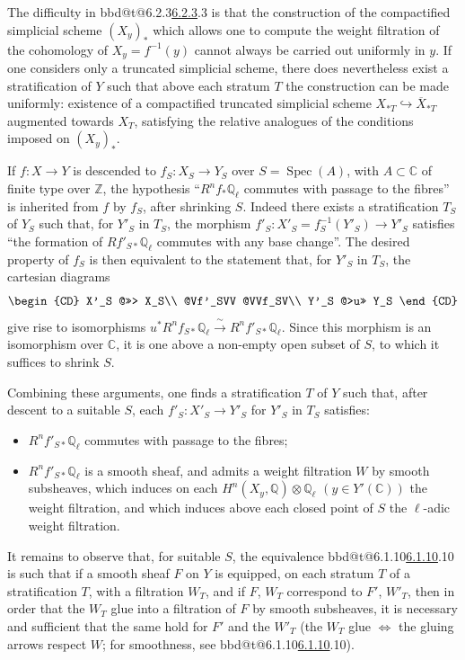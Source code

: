 \documentclass[12pt,oneside]{amsbook}
\makeatletter
\DeclareRobustCommand{\rn}[1]{%
  \ifcsname bbd@t@#1\endcsname\hyperlink{bbd:#1}{#1}\else#1\fi}
\theoremstyle{plain}
\theoremstyle{definition}
\newcommand{\C}{\mathbb{C}} \newcommand{\Q}{\mathbb{Q}}
\newcommand{\Z}{\mathbb{Z}}   \newcommand{\D}{\mathcal{D}}
\newcommand{\Ql}{\mathbb{Q}_{\ell}}
\makeatother
\begin{document}
\smallskip
The difficulty in \rn{6.2.3} is that the construction of the compactified simplicial scheme $(X_y)_*$ which allows one to compute the weight filtration of the cohomology of $X_y=f^{-1}(y)$ cannot always be carried out uniformly in $y$. If one considers only a truncated simplicial scheme, there does nevertheless exist a stratification of $Y$ such that above each stratum $T$ the construction can be made uniformly: existence of a compactified truncated simplicial scheme $X_{*T}\hookrightarrow\overline X_{*T}$ augmented towards $X_T$, satisfying the relative analogues of the conditions imposed on $(X_y)_*$.

\smallskip
If $f:X\longrightarrow Y$ is descended to $f_S:X_S\longrightarrow Y_S$ over $S=\operatorname{Spec}(A)$, with $A\subset\C$ of finite type over $\Z$, the hypothesis ``$R^n f_*\Ql$ commutes with passage to the fibres'' is inherited from $f$ by $f_S$, after shrinking $S$. Indeed there exists a stratification $T_S$ of $Y_S$ such that, for $Y'_S$ in $T_S$, the morphism $f'_S:X'_S=f_S^{-1}(Y'_S)\longrightarrow Y'_S$ satisfies ``the formation of $Rf'_{S*}\Ql$ commutes with any base change''. The desired property of $f_S$ is then equivalent to the statement that, for $Y'_S$ in $T_S$, the cartesian diagrams
\[
\begin{CD}
X'_S @>>> X_S\\
@Vf'_SVV @VVf_SV\\
Y'_S @>u>> Y_S
\end{CD}
\]
give rise to isomorphisms $u^{*}R^n f_{S*}\Ql\xrightarrow{\ \sim\ }R^n f'_{S*}\Ql$. Since this morphism is an isomorphism over $\C$, it is one above a non-empty open subset of $S$, to which it suffices to shrink $S$.

\smallskip
Combining these arguments, one finds a stratification $T$ of $Y$ such that, after descent to a suitable $S$, each $f'_S:X'_S\to Y'_S$ for $Y'_S$ in $T_S$ satisfies:

\begin{itemize}[leftmargin=2em]
\item[a)] $R^n f'_{S*}\Ql$ commutes with passage to the fibres;
\item[b)] $R^n f'_{S*}\Ql$ is a smooth sheaf, and admits a weight filtration $W$ by smooth subsheaves, which induces on each $H^n(X_y,\Q)\otimes\Ql$ $(y\in Y'(\C))$ the weight filtration, and which induces above each closed point of $S$ the $\ell$-adic weight filtration.
\end{itemize}

\smallskip
It remains to observe that, for suitable $S$, the equivalence \rn{6.1.10} is such that if a smooth sheaf $F$ on $Y$ is equipped, on each stratum $T$ of a stratification $T$, with a filtration $W_T$, and if $F$, $W_T$ correspond to $F'$, $W'_T$, then in order that the $W_T$ glue into a filtration of $F$ by smooth subsheaves, it is necessary and sufficient that the same hold for $F'$ and the $W'_T$ (the $W_T$ glue $\Longleftrightarrow$ the gluing arrows respect $W$; for smoothness, see \rn{6.1.10}).
\end{document}
